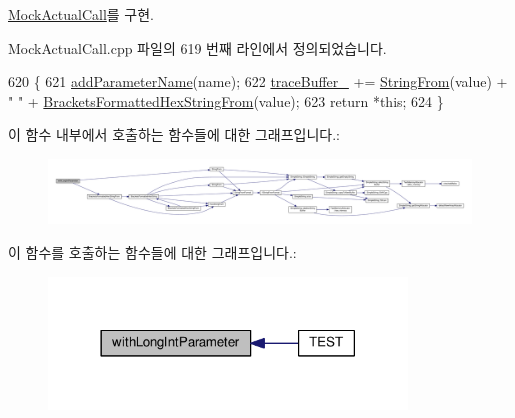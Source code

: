 \hyperlink{class_mock_actual_call_a5747ca52d6aa9c021117beafa539eda0}{Mock\+Actual\+Call}를 구현.



Mock\+Actual\+Call.\+cpp 파일의 619 번째 라인에서 정의되었습니다.


\begin{DoxyCode}
620 \{
621     \hyperlink{class_mock_actual_call_trace_a6957aad0b7b247737e33be49594bf5c9}{addParameterName}(name);
622     \hyperlink{class_mock_actual_call_trace_ab139777fb0949c9d0fbdb4d8b2e63351}{traceBuffer\_} += \hyperlink{_simple_string_8h_a195ee4ca8d909f9ebf37e963d4564446}{StringFrom}(value) + \textcolor{stringliteral}{" "} + 
      \hyperlink{_simple_string_8h_a79aff9fc6d44ba7c6f3dc9dc764c476a}{BracketsFormattedHexStringFrom}(value);
623     \textcolor{keywordflow}{return} *\textcolor{keyword}{this};
624 \}
\end{DoxyCode}


이 함수 내부에서 호출하는 함수들에 대한 그래프입니다.\+:
\nopagebreak
\begin{figure}[H]
\begin{center}
\leavevmode
\includegraphics[width=350pt]{class_mock_actual_call_trace_ac7e0b15690e2805d19d6228e5760fb48_cgraph}
\end{center}
\end{figure}




이 함수를 호출하는 함수들에 대한 그래프입니다.\+:
\nopagebreak
\begin{figure}[H]
\begin{center}
\leavevmode
\includegraphics[width=270pt]{class_mock_actual_call_trace_ac7e0b15690e2805d19d6228e5760fb48_icgraph}
\end{center}
\end{figure}


